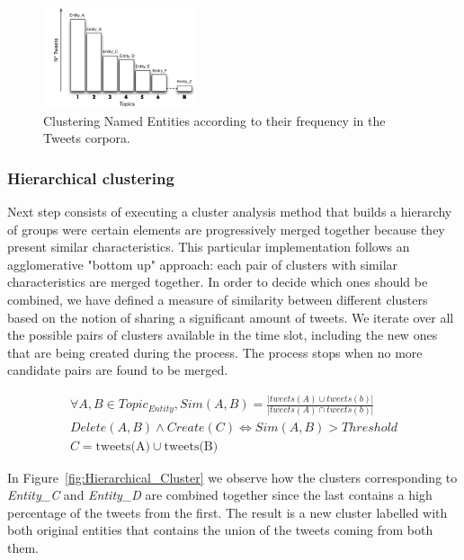 \documentclass{sig-alternate}
\begin{document}
\begin{figure}[h!]
\centering
\includegraphics[width=0.4\textwidth]{figure/EntityCluster.png}
\caption{Clustering Named Entities according to their frequency in the Tweets corpora.}
\label{fig:EntityCluster}
\end{figure}

\subsubsection{Hierarchical clustering}

Next step consists of executing a cluster analysis method that builds a hierarchy of groups were certain elements are progressively merged together because they present similar characteristics. This particular implementation follows an agglomerative "bottom up" approach: each pair of clusters with similar characteristics are merged together. In order to decide which ones should be combined, we have defined a measure of similarity between different clusters based on the notion of sharing a significant amount of tweets. We iterate over all the possible pairs of clusters available in the time slot, including the new ones that are being created during the process. The process stops when no more candidate pairs are found to be merged. 

\begin{equation}
\begin{split}
\forall A, B \in Topic_{Entity}, Sim (A,B) =\frac{\left | tweets(A) \cup  tweets(b) \right |}{\left | tweets(A) \cap  tweets(b) \right |} \\
Delete(A, B) \wedge Create(C) \Leftrightarrow  Sim (A,B) > Threshold \\
C= \text{tweets(A)} \cup \text{tweets(B)}
\end{split}
\end{equation}


In Figure~\ref{fig:Hierarchical_Cluster} we observe how the clusters corresponding to \textit{Entity\_C} and \textit{Entity\_D} are combined together since the last contains a high percentage of the tweets from the first. The result is a new cluster labelled with both original entities that contains the union of the tweets coming from both them.
\end{document}
